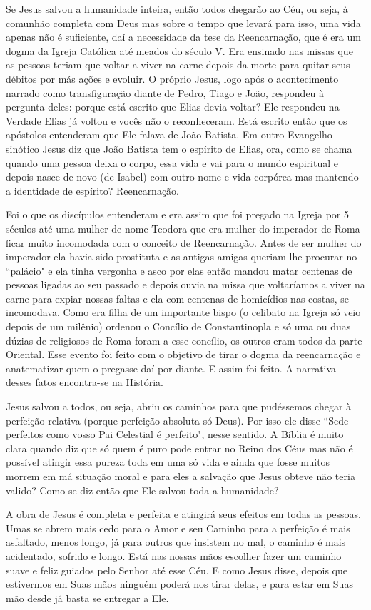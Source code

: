 \emdash{}Se Jesus salvou a humanidade inteira, então todos chegarão ao Céu, ou seja, à comunhão completa com Deus mas sobre o tempo que levará para isso, uma vida apenas não é suficiente, daí a necessidade da tese da Reencarnação, que é era um dogma da Igreja Católica até meados do século V. Era ensinado nas missas que as pessoas teriam que voltar a viver na carne depois da morte para quitar seus débitos por más ações e evoluir. O próprio Jesus, logo após o acontecimento narrado como transfiguração diante de Pedro, Tiago e João, respondeu à pergunta deles: porque está escrito que Elias devia voltar? Ele respondeu na Verdade Elias já voltou e vocês não o reconheceram. Está escrito então que os apóstolos entenderam que Ele falava de João Batista. Em outro Evangelho sinótico Jesus diz que João Batista tem o espírito de Elias, ora, como se chama quando uma pessoa deixa o corpo, essa vida e vai para o mundo espiritual e depois nasce de novo (de Isabel) com outro nome e vida corpórea mas mantendo a identidade de espírito? Reencarnação.

\emdash{}Foi o que os discípulos entenderam e era assim que foi pregado na Igreja por 5 séculos até uma mulher de nome Teodora que era mulher do imperador de Roma ficar muito incomodada com o conceito de Reencarnação. Antes de ser mulher do imperador ela havia sido prostituta e as antigas amigas queriam lhe procurar no ``palácio" e ela tinha vergonha e asco por elas então mandou matar centenas de pessoas ligadas ao seu passado e depois ouvia na missa que voltaríamos a viver na carne para expiar nossas faltas e ela com centenas de homicídios nas costas, se incomodava. Como era filha de um importante bispo (o celibato na Igreja só veio depois de um milênio) ordenou o Concílio de Constantinopla e só uma ou duas dúzias de religiosos de Roma foram a esse concílio, os outros eram todos da parte Oriental. Esse evento foi feito com o objetivo de tirar o dogma da reencarnação e anatematizar quem o pregasse daí por diante. E assim foi feito. A narrativa desses fatos encontra-se na História.

\emdash{}Jesus salvou a todos, ou seja, abriu os caminhos para que pudéssemos chegar à perfeição relativa (porque perfeição absoluta só Deus). Por isso ele disse ``Sede perfeitos como vosso Pai Celestial é perfeito", nesse sentido. A Bíblia é muito clara quando diz que só quem é puro pode entrar no Reino dos Céus mas não é possível atingir essa pureza toda em uma só vida e ainda que fosse muitos morrem em má situação moral e para eles a salvação que Jesus obteve não teria valido? Como se diz então que Ele salvou toda a humanidade?

\emdash{}A obra de Jesus é completa e perfeita e atingirá seus efeitos em todas as pessoas. Umas se abrem mais cedo para o Amor e seu Caminho para a perfeição é mais asfaltado, menos longo, já para outros que insistem no mal, o caminho é mais acidentado, sofrido e longo. Está nas nossas mãos escolher fazer um caminho suave e feliz guiados pelo Senhor até esse Céu. E como Jesus disse, depois que estivermos em Suas mãos ninguém poderá nos tirar delas, e para estar em Suas mão desde já basta se entregar a Ele.
